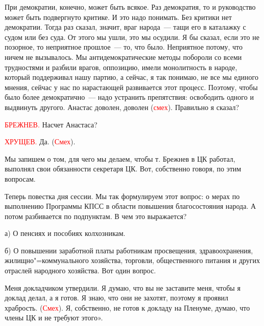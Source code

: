 \documentclass{kursa4}
\begin{document}
      {При демократии, конечно, может быть всякое. Раз демократия, то и руководство может быть подвергнуто критике. И это надо понимать. Без критики нет демократии. Тогда раз сказал, значит, враг народа~--- тащи его в каталажку с судом или без суда. От этого мы ушли, это мы осудили. Я бы сказал, если это не позорное, то неприятное прошлое~--- то, что было. Неприятное потому, что ничем не вызывалось. Мы антидемократические методы побороли со всеми трудностями и разбили врагов, оппозицию, имели монолитность в народе, который поддерживал нашу партию, а сейчас, я так понимаю, не все мы единого мнения, сейчас у нас по нарастающей развивается этот процесс. Поэтому, чтобы было более демократично~--- надо устранить препятствия: освободить одного и выдвинуть другого. Анастас доволен, доволен (}\textcolor{red}{смех}{). Правильно я сказал?}

      \textcolor{red}{БРЕЖНЕВ.}{
      Насчет Анастаса?}

      \textcolor{red}{ХРУЩЕВ.}{
      Да. (}\textcolor{red}{Смех}{).}

      {Мы запишем о том, для чего мы делаем, чтобы т. Брежнев в ЦК работал, выполнял свои обязанности секретаря ЦК. Вот, собственно говоря, по этим вопросам.}

      {Теперь повестка дня сессии. Мы так формулируем этот вопрос: о мерах по выполнению Программы КПСС в области повышения благосостояния народа. А потом разбивается по подпунктам. В чем это выражается?}

      {а) О пенсиях и пособиях колхозникам.}

      {б) О повышении заработной платы работникам просвещения, здравоохранения, жилищно"=коммунального хозяйства, торговли, общественного питания и других отраслей народного хозяйства. Вот один вопрос.}

      {Меня докладчиком утвердили. Я думаю, что вы не заставите меня, чтобы я доклад делал, а я готов. Я знаю, что они не захотят, поэтому я проявил храбрость. (}\textcolor{red}{Смех}{). Я, собственно, не готов к докладу на Пленуме, думаю, что члены ЦК и не требуют этого».}

    \pagebreak
\end{document}
